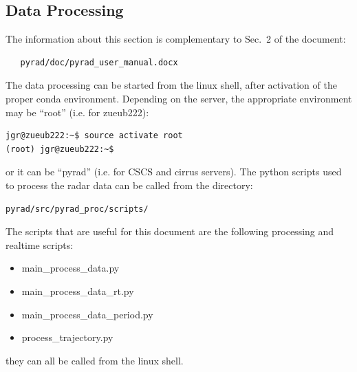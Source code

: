 \documentclass[a4paper,11pt,pdftex,twoside]{scrartcl}
\begin{document}
\subsection{Data Processing}
The information about this section is complementary to Sec.~2 of the document:

\begin{verbatim}
   pyrad/doc/pyrad_user_manual.docx
\end{verbatim}


The data processing can be started from the linux shell, after activation of the proper conda environment. Depending on the server, the appropriate environment may be  ``root'' (i.e. for zueub222):

\begin{verbatim}
jgr@zueub222:~$ source activate root
(root) jgr@zueub222:~$ 
\end{verbatim}

\noindent
or it can be ``pyrad'' (i.e. for CSCS and cirrus servers).
The python scripts used to process the radar data can be called from the directory:

\begin{verbatim}
pyrad/src/pyrad_proc/scripts/
\end{verbatim}

\noindent
The scripts that are useful for this document are the following processing and realtime scripts:
\begin{itemize}
   \item main\_process\_data.py
   \item main\_process\_data\_rt.py
   \item main\_process\_data\_period.py
   \item process\_trajectory.py
\end{itemize}
they can all be called from the linux shell.
\end{document}
